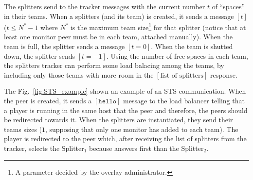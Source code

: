 The splitters send to the tracker messages with the current number $t$
of ``spaces'' in their teams. When a splitters (and its team) is
created, it sends a message $[t]$ ($t \leq N^*-1$ where $N^*$ is the
maximum team size\footnote{A parameter decided by the overlay
administrator.} for that splitter (notice that at least one monitor
peer must be in each team, attached manually). When the team is full,
the splitter sends a message $[t=0]$. When the team is shutted
down, the splitter sends $[t=-1]$. Using the number of free spaces in
each team, the splitters tracker can perform some load balacing among
the teams, by including only those teams with more room in the
$[\text{list of splitters}]$ response.

\begin{figure*}
  \caption{Timeline example of an STS interaction.\label{fig:STS_example}}
\end{figure*}

The Fig.~\ref{fig:STS_example} shown an example of an STS
communication. When the peer is created, it sends a $[\mathtt{hello}]$
message to the load balancer telling that a player is running in the
same host that the peer and therefore, the peers should be redirected
towards it. When the splitters are instantiated, they send their teams
sizes ($1$, supposing that only one monitor has added to each
team). The player is redirected to the peer which, after receiving the
list of splitters from the tracker, selects the Splitter$_1$ because
answers first than the Splitter$_2$.

